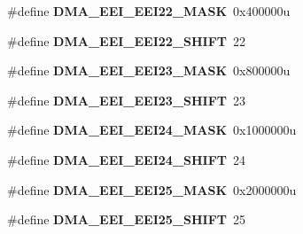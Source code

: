 \begin{DoxyCompactItemize}
\item 
\hypertarget{group___d_m_a___register___masks_gaa5c7dca03cf91de301361d880d3852c5}{}\#define {\bfseries D\+M\+A\+\_\+\+E\+E\+I\+\_\+\+E\+E\+I22\+\_\+\+M\+A\+S\+K}~0x400000u\label{group___d_m_a___register___masks_gaa5c7dca03cf91de301361d880d3852c5}

\item 
\hypertarget{group___d_m_a___register___masks_ga1ea49962e1ab459d7ad61ff6699a694c}{}\#define {\bfseries D\+M\+A\+\_\+\+E\+E\+I\+\_\+\+E\+E\+I22\+\_\+\+S\+H\+I\+F\+T}~22\label{group___d_m_a___register___masks_ga1ea49962e1ab459d7ad61ff6699a694c}

\item 
\hypertarget{group___d_m_a___register___masks_ga20234a5abfd4b346471204f43d33a130}{}\#define {\bfseries D\+M\+A\+\_\+\+E\+E\+I\+\_\+\+E\+E\+I23\+\_\+\+M\+A\+S\+K}~0x800000u\label{group___d_m_a___register___masks_ga20234a5abfd4b346471204f43d33a130}

\item 
\hypertarget{group___d_m_a___register___masks_gad8217a06faed89c0872aa38c79bfeea7}{}\#define {\bfseries D\+M\+A\+\_\+\+E\+E\+I\+\_\+\+E\+E\+I23\+\_\+\+S\+H\+I\+F\+T}~23\label{group___d_m_a___register___masks_gad8217a06faed89c0872aa38c79bfeea7}

\item 
\hypertarget{group___d_m_a___register___masks_ga90f6b41dfae18228d792fdc9f38c429d}{}\#define {\bfseries D\+M\+A\+\_\+\+E\+E\+I\+\_\+\+E\+E\+I24\+\_\+\+M\+A\+S\+K}~0x1000000u\label{group___d_m_a___register___masks_ga90f6b41dfae18228d792fdc9f38c429d}

\item 
\hypertarget{group___d_m_a___register___masks_gad3a9f9eedb66df19af7fbaff9fecabfc}{}\#define {\bfseries D\+M\+A\+\_\+\+E\+E\+I\+\_\+\+E\+E\+I24\+\_\+\+S\+H\+I\+F\+T}~24\label{group___d_m_a___register___masks_gad3a9f9eedb66df19af7fbaff9fecabfc}

\item 
\hypertarget{group___d_m_a___register___masks_gae1c5181118d772f9393dba12b38469b2}{}\#define {\bfseries D\+M\+A\+\_\+\+E\+E\+I\+\_\+\+E\+E\+I25\+\_\+\+M\+A\+S\+K}~0x2000000u\label{group___d_m_a___register___masks_gae1c5181118d772f9393dba12b38469b2}

\item 
\hypertarget{group___d_m_a___register___masks_gadaf4f497c85d60d7ec529467ed697b77}{}\#define {\bfseries D\+M\+A\+\_\+\+E\+E\+I\+\_\+\+E\+E\+I25\+\_\+\+S\+H\+I\+F\+T}~25\label{group___d_m_a___register___masks_gadaf4f497c85d60d7ec529467ed697b77}


\end{DoxyCompactItemize}
